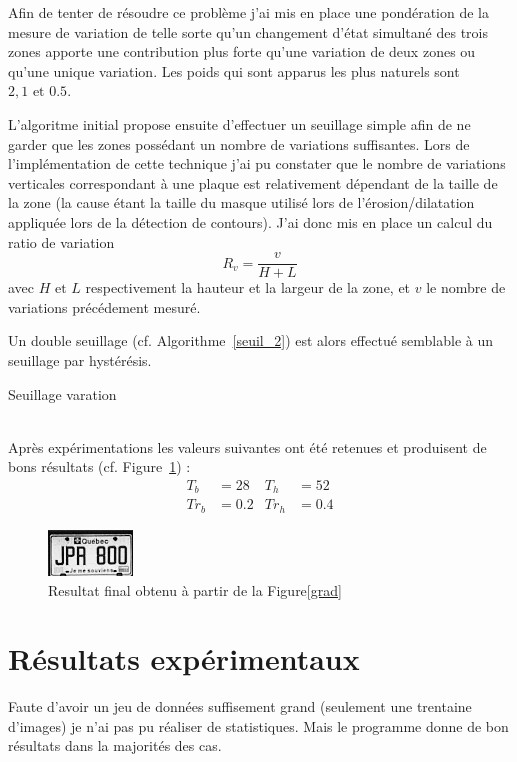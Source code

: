 \documentclass[a4paper,10pt,twocolumn]{article}
\begin{document}
Afin de tenter de résoudre ce problème j'ai mis en place une pondération de la mesure de variation de telle sorte qu'un changement d'état simultané des trois zones apporte une contribution plus forte qu'une variation de deux zones ou qu'une unique variation. Les poids qui sont apparus les plus naturels sont $2, 1 \text{ et } 0.5$.

L'algoritme initial propose ensuite d'effectuer un seuillage simple afin de ne garder que les zones possédant un nombre de variations suffisantes. Lors de l'implémentation de cette technique j'ai pu constater que le nombre de variations verticales correspondant à une plaque est relativement dépendant de la taille de la zone (la cause étant la taille du masque utilisé lors de l'érosion/dilatation appliquée lors de la détection de contours). J'ai donc mis en place un calcul du ratio de variation
\begin{equation}
  R_v = \frac{v}{H+L}
\end{equation}
avec $H \text{ et } L$ respectivement la hauteur et la largeur de la zone, et $v$ le nombre de variations précédement mesuré.

Un double seuillage (cf. Algorithme~\ref{seuil_2}) est alors effectué semblable à un seuillage par hystérésis.
\begin{algorithm} 
	\caption{Seuillage varation\label{seuil_2}}
	
\end{algorithm}\\
Après expérimentations les valeurs suivantes ont été retenues et produisent de bons résultats (cf. Figure~\ref{plate}) :
\begin{align*}
  T_b &= 28 &T_h &= 52\\
  Tr_b &= 0.2 &Tr_h &= 0.4
\end{align*}
\begin{figure}[H]
	\centering 
	  \includegraphics{img/plate.png}
	\caption{Resultat final obtenu à partir de la Figure\ref{grad}\label{plate}}
\end{figure}

\section{Résultats expérimentaux}
Faute d'avoir un jeu de données suffisement grand (seulement une trentaine d'images) je n'ai pas pu réaliser de statistiques. Mais le programme donne de bon résultats dans la majorités des cas.
\end{document}
